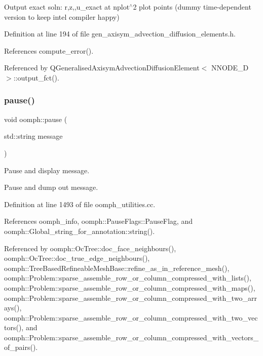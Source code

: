 Output exact soln\+: r,z,,u\+\_\+exact at nplot$^\wedge$2 plot points (dummy time-\/dependent version to keep intel compiler happy) 



Definition at line 194 of file gen\+\_\+axisym\+\_\+advection\+\_\+diffusion\+\_\+elements.\+h.



References compute\+\_\+error().



Referenced by Q\+Generalised\+Axisym\+Advection\+Diffusion\+Element$<$ N\+N\+O\+D\+E\+\_\+D $>$\+::output\+\_\+fct().

\mbox{\label{namespaceoomph_a4a82243b0ce4c28469a290fe2d7cd2c4}} 
\subsubsection{\texorpdfstring{pause()}{pause()}}
{\footnotesize\ttfamily void oomph\+::pause (\begin{DoxyParamCaption}\item[{std\+::string}]{message }\end{DoxyParamCaption})}



Pause and display message. 

Pause and dump out message. 

Definition at line 1493 of file oomph\+\_\+utilities.\+cc.



References oomph\+\_\+info, oomph\+::\+Pause\+Flags\+::\+Pause\+Flag, and oomph\+::\+Global\+\_\+string\+\_\+for\+\_\+annotation\+::string().



Referenced by oomph\+::\+Oc\+Tree\+::doc\+\_\+face\+\_\+neighbours(), oomph\+::\+Oc\+Tree\+::doc\+\_\+true\+\_\+edge\+\_\+neighbours(), oomph\+::\+Tree\+Based\+Refineable\+Mesh\+Base\+::refine\+\_\+as\+\_\+in\+\_\+reference\+\_\+mesh(), oomph\+::\+Problem\+::sparse\+\_\+assemble\+\_\+row\+\_\+or\+\_\+column\+\_\+compressed\+\_\+with\+\_\+lists(), oomph\+::\+Problem\+::sparse\+\_\+assemble\+\_\+row\+\_\+or\+\_\+column\+\_\+compressed\+\_\+with\+\_\+maps(), oomph\+::\+Problem\+::sparse\+\_\+assemble\+\_\+row\+\_\+or\+\_\+column\+\_\+compressed\+\_\+with\+\_\+two\+\_\+arrays(), oomph\+::\+Problem\+::sparse\+\_\+assemble\+\_\+row\+\_\+or\+\_\+column\+\_\+compressed\+\_\+with\+\_\+two\+\_\+vectors(), and oomph\+::\+Problem\+::sparse\+\_\+assemble\+\_\+row\+\_\+or\+\_\+column\+\_\+compressed\+\_\+with\+\_\+vectors\+\_\+of\+\_\+pairs().

